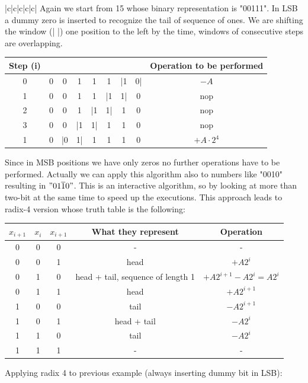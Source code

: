\begin{center}
\begin{tabular}{|c|c|c|c|c|}
Again we start from 15 whose binary representation is "00111". In LSB a dummy zero is inserted to recognize the tail of sequence of ones. We are shifting the window (| |) one position to the left by the time, windows of consecutive steps are overlapping.
\begin{center}
\begin{tabular}{|c|c|c|c|c|c|c|c|c|}
  \hline
  Step (i)& & & & & & & & Operation to be performed\\
  \hline
    0&    0&    0&  1&  1&  1&  |1& 0|&   $-A$\\
    1&    0&    0&  1&  1&  |1&  1|&  0&    nop\\
    2&    0&    0&  1&  |1&   1|&  1& 0&    nop\\
    3&    0&    0&  |1& 1|&   1&   1& 0&    nop\\
    1&    0&    |0& 1|& 1&    1&   1& 0&    $+A \cdot 2^4$\\
  \hline
\end{tabular}
\end{center}
Since in MSB positions we have only zeros no further operations have to be performed. Actually we can apply this algorithm also to numbers like "0010" resulting in $"01\overline{1}0"$. This is an interactive algorithm, so by looking at more than two-bit at the same time to speed up the executions. This approach leads to radix-4 version whose truth table is the following:
\begin{center}
\begin{tabular}{|c|c|c|c|c|}
  \hline
  $x_{i+1}$&    $x_i$&  $x_{i+1}$&  What they represent& Operation\\
  \hline
  0&        0&    0&      -&          -\\
  0&        0&    1&      head& $+A2^i$\\
  0&        1&    0&      head + tail, sequence of length 1&   $+A2^{i+1}-A2^i=A2^i$\\
  0&        1&    1&      head&  $+A2^{i+1}$\\
  1&        0&    0&      tail&  $-A2^{i+1}$\\
  1&        0&    1&      head + tail&  $-A2^i$\\
  1&        1&    0&      tail&  $-A2^i$\\
  1&        1&    1&      -& -\\
  \hline
\end{tabular}
\end{center}
Applying radix 4 to previous example (always inserting dummy bit in LSB):

\end{tabular}
\end{center}

